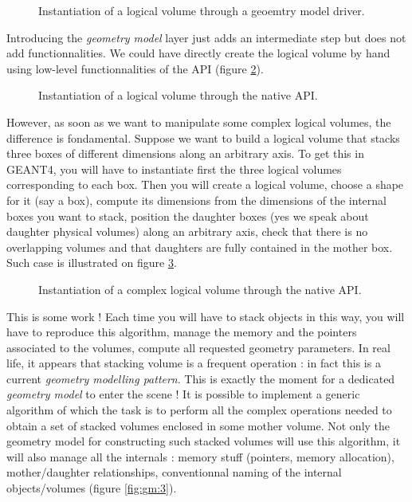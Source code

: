 \begin{figure}[h]
\begin{center}
\scalebox{0.75}{}
\end{center}
\caption{Instantiation of  a logical  volume through a  geoemtry model
  driver.}\label{fig:gm:0}
\end{figure}


\pn  Introducing   the  \emph{geometry  model}  layer   just  adds  an
intermediate step  but does not  add functionnalities.  We  could have
directly   create  the   logical  volume   by  hand   using  low-level
functionnalities of the API (figure \ref{fig:gm:1}).

\begin{figure}[h]
\begin{center}
\scalebox{0.75}{}
\end{center}
\caption{Instantiation of  a logical  volume through the native
API.}\label{fig:gm:1}
\end{figure}

However, as soon  as we want to manipulate some
complex logical  volumes, the  difference is fondamental.   Suppose we
want to  build a logical volume  that stacks three  boxes of different
dimensions along  an arbitrary axis. To  get this in  GEANT4, you will
have to  instantiate first the three logical  volumes corresponding to
each box. Then you will create a logical volume, choose a shape for it
(say  a  box), compute  its  dimensions  from  the dimensions  of  the
internal boxes you want to  stack, position the daughter boxes (yes we
speak about daughter  physical volumes) along an arbitrary  axis, check that there
is no overlapping volumes and that daughters are fully contained in the
mother box. Such case is illustrated on figure \ref{fig:gm:2}.


\begin{figure}[h]
\begin{center}
\scalebox{0.75}{}
\end{center}
\caption{Instantiation of  a complex logical  volume through the native
API.}\label{fig:gm:2}
\end{figure}

This is some work ! Each time you will  have to stack objects in this way, you
will have to reproduce this algorithm, manage the memory and the pointers associated to
the volumes, compute all  requested geometry parameters. In real life,
it appears  that stacking  volume is a  frequent operation :  in fact
this is a current  \emph{geometry modelling pattern}.  This is exactly
the moment for a dedicated  \emph{geometry model} to enter the scene !
It is possible  to implement a generic algorithm of  which the task is
to  perform all  the  complex operations  needed  to obtain  a set  of
stacked  volumes enclosed in  some mother  volume.  Not  only the geometry
model for constructing such stacked volumes
will use this algorithm, it  will also
manage all  the internals  : memory stuff (pointers, memory allocation),
mother/daughter relationships,
conventionnal naming of the internal objects/volumes (figure \ref{fig:gm:3}).


